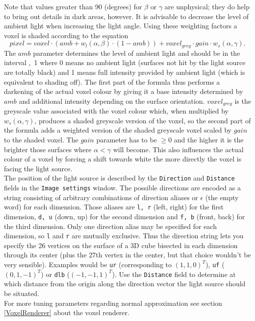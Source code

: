 \documentclass[11pt]{article}
\begin{document}
Note that values greater than 90 (degrees) for $\beta$ or $\gamma$ are unphysical;
they do help to bring out details in dark areas, however. It is advisable to
decrease the level of ambient light when increasing the light angle.
Using these weighting factors a voxel is shaded according to the equation
\begin{displaymath}
pixel = voxel \cdot (amb + w_l(\alpha,\beta) \cdot (1 - amb)) + voxel_{grey} \cdot gain \cdot w_s(\alpha,\gamma).
\end{displaymath}
The $amb$ parameter determines the level of ambient light and should be in the
interval \hbox{, 1\rbrack} where 0 means no ambient light (surfaces not hit
by the light source are totally black) and 1 means full intensity provided by ambient
light (which is equivalent to shading off). The first part of the formula thus
performs a darkening of the actual voxel colour by giving it a base intensity
determined by $amb$ and additional intensity depending on the surface orientation.
$voxel_{grey}$ is the greyscale value associated with the voxel colour which,
when multiplied by $w_s(\alpha,\gamma)$, produces a shaded greyscale version of the voxel,
so the second part of the formula adds a weighted version of the shaded greyscale
voxel scaled by $gain$ to the shaded voxel. The $gain$ parameter has to be $\ge 0$ and the
higher it is the brighter those surfaces where $\alpha < \gamma$ will become. This
also influences the actual colour of a voxel by forcing a shift towards white the
more directly the voxel is facing the light source.\\
The position of the light source is described by the \texttt{Direction} and \texttt{Distance}
fields in the \texttt{Image settings} window. The possible directions are encoded as a string
consisting of arbitrary combinations of direction aliases or $\epsilon$ (the empty
word) for each dimension. Those aliases are \texttt{l, r} (left, right) for the first dimension,
\texttt{d, u} (down, up) for the second dimension and \texttt{f, b} (front, back) for the
third dimension. Only one direction alias may be specified for each dimension, so \texttt{l}
and \texttt{r} are mutually exclusive. Thus the direction string lets you specify the
26 vertices on the surface of a 3D cube bisected in each dimension through its center
(plus the 27th vertex
in the center, but that choice wouldn't be very sensible). Examples would be \texttt{ur}
(corresponding to $(1,1,0)^T$), \texttt{uf} ($(0,1,-1)^T$) or \texttt{dlb} ($(-1,-1,1)^T$).
Use the \texttt{Distance} field to determine at which distance from the origin along the
direction vector the light source should be situated.\\
For more tuning parameters regarding normal approximation see section \ref{VoxelRenderer}
about the voxel renderer.
\end{document}
